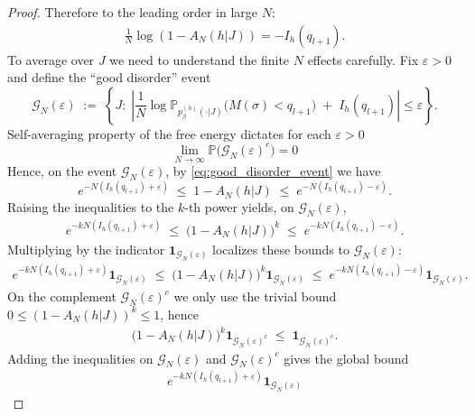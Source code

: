 \documentclass{article}
\theoremstyle{remark} %
\begin{document}
\begin{proof}
Therefore to the leading order in large $N$:
\begin{align}
\frac{1}{N}\log(1-A_N(h \vert J)) = - I_h(q_{l+1}).
\end{align}
 To average over $J$ we need to understand the finite $N$ effects carefully. Fix $\varepsilon>0$ and define the ``good disorder'' event
\begin{equation}\label{eq:good_disorder_event}
\mathcal G_N(\varepsilon)
\;:=\;
\left\{
J:\;
\left|
\frac{1}{N}\log \mathbb P_{p^{(h)}_\beta(\cdot \vert J)} \big(M(\sigma)<q_{l+1}\big)
\;+\;
I_h(q_{l+1})
\right|
\le \varepsilon
\right\}.
\end{equation}
Self-averaging property of the free energy dictates for each $\varepsilon>0$
\begin{equation}\label{eq:good_event_prob}
\lim_{N\to \infty}\mathbb P \big(\mathcal G_N(\varepsilon)^c\big)=0
\end{equation}
Hence, on the event $\mathcal G_N(\varepsilon)$, by \eqref{eq:good_disorder_event} we have
\begin{equation}\label{eq:tail_sandwich}
e^{-N(I_h(q_{l+1})+\varepsilon)}
\;\le\;
1-A_N(h \vert J)
\;\le\;
e^{-N(I_h(q_{l+1})-\varepsilon)}.
\end{equation}
Raising the inequalities to the $k$-th power yields, on
$\mathcal G_N(\varepsilon)$,
\begin{align}
e^{-kN(I_h(q_{l+1})+\varepsilon)}
\;\le\;
\big(1-A_N(h \vert J)\big)^k
\;\le\;
e^{-kN(I_h(q_{l+1})-\varepsilon)}.
\end{align}
Multiplying by the indicator $\mathbf 1_{\mathcal G_N(\varepsilon)}$ localizes these bounds to
$\mathcal G_N(\varepsilon)$:
\begin{align}
e^{-kN(I_h(q_{l+1})+\varepsilon)}\mathbf 1_{\mathcal G_N(\varepsilon)}
\;\le\;
\big(1-A_N(h \vert J)\big)^k\mathbf 1_{\mathcal G_N(\varepsilon)}
\;\le\;
e^{-kN(I_h(q_{l+1})-\varepsilon)}\mathbf 1_{\mathcal G_N(\varepsilon)}.
\end{align}
On the complement $\mathcal G_N(\varepsilon)^c$ we only use the trivial bound
$0\le (1-A_N(h \vert J))^k\le 1$, hence
\begin{align}
\big(1-A_N(h \vert J)\big)^k\mathbf 1_{\mathcal G_N(\varepsilon)^c}
\;\le\;
\mathbf 1_{\mathcal G_N(\varepsilon)^c}.
\end{align}
Adding the inequalities on $\mathcal G_N(\varepsilon)$ and $\mathcal G_N(\varepsilon)^c$ gives the
global bound
\begin{align}
e^{-kN(I_h(q_{l+1})+\varepsilon)}\mathbf 1_{\mathcal G_N(\varepsilon)}

\end{align}
\end{proof}
\end{document}
